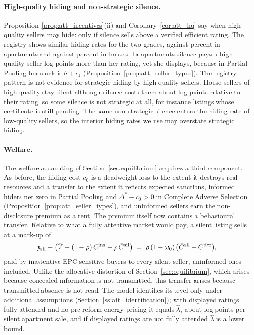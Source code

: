 \paragraph{High-quality hiding and non-strategic silence.}
Proposition~\ref{prop:att_incentives}(ii) and Corollary~\ref{cor:att_hq} say when high-quality sellers may hide: only if silence sells above a verified efficient rating. The registry shows similar hiding rates for the two grades, \attSigmaOneApt{} against \attSigmaZeroApt{} percent in apartments and \attSigmaOneHouse{} against \attSigmaZeroHouse{} percent in houses. In apartments silence pays a high-quality seller \attExcessApt{} log points more than her rating, yet she displays, because in Partial Pooling her slack is $b+c_1$ (Proposition~\ref{prop:att_seller_types}). The registry pattern is not evidence for strategic hiding by high-quality sellers. House sellers of high quality stay silent although silence costs them about \attHighLossHouse{} log points relative to their rating, so some silence is not strategic at all, for instance listings whose certificate is still pending. The same non-strategic silence enters the hiding rate of low-quality sellers, so the interior hiding rates we use may overstate strategic hiding.

\paragraph{Welfare.}
The welfare accounting of Section~\ref{sec:equilibrium} acquires a third component. As before, the hiding cost $c_0$ is a deadweight loss to the extent it destroys real resources and a transfer to the extent it reflects expected sanctions, informed hiders net zero in Partial Pooling and $\Delta^*-c_0>0$ in Complete Adverse Selection (Proposition~\ref{prop:att_seller_types}), and uninformed sellers earn the non-disclosure premium as a rent. The premium itself now contains a behavioural transfer. Relative to what a fully attentive market would pay, a silent listing sells at a mark-up of
\begin{equation}
    p_{\rm sil}-\big(\bar V-(1-\rho)\,C^{\rm ins}-\rho\,\bar C^{\rm sil}\big)\;=\;\rho\,(1-\omega_0)\,\big(\bar C^{\rm sil}-C^{\rm def}\big),
    \label{eq:att_markup}
\end{equation}
paid by inattentive EPC-sensitive buyers to every silent seller, uninformed ones included. Unlike the allocative distortion of Section~\ref{sec:equilibrium}, which arises because concealed information is not transmitted, this transfer arises because transmitted absence is not read. The model identifies its level only under additional assumptions (Section~\ref{ss:att_identification}); with displayed ratings fully attended and no pre-reform energy pricing it equals $\hat\lambda$, about \attLamApt{} log points per silent apartment sale, and if displayed ratings are not fully attended $\hat\lambda$ is a lower bound.

